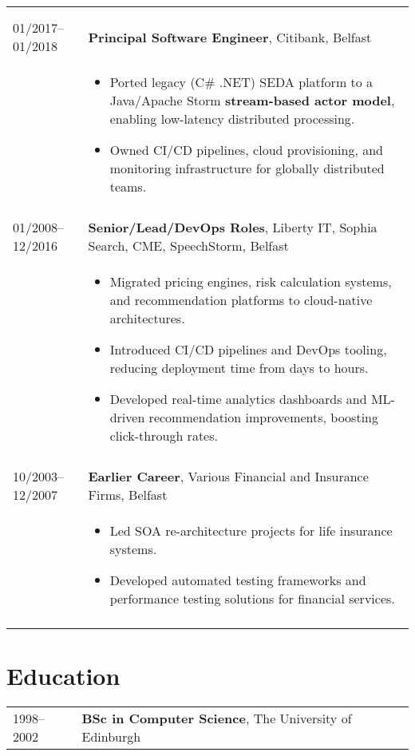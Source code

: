 \documentclass[2pt,a4paper]{article}
\newlength{\datecolumn}
\newlength{\textcolumn}
\begin{document}
\begin{longtable}{p{\datecolumn} p{\textcolumn}}
\begin{itemize}
                   \end{itemize} \\ \\
01/2017--01/2018 & \textbf{Principal Software Engineer}, Citibank, Belfast \\
                 & \begin{itemize}
                        \item Ported legacy (C\# .NET) SEDA platform to a Java/Apache Storm \textbf{stream-based actor model}, enabling low-latency distributed processing.
                        \item Owned CI/CD pipelines, cloud provisioning, and monitoring infrastructure for globally distributed teams.
                   \end{itemize} \\ \\
01/2008--12/2016 & \textbf{Senior/Lead/DevOps Roles}, Liberty IT, Sophia Search, CME, SpeechStorm, Belfast \\
                 & \begin{itemize}
                        \item Migrated pricing engines, risk calculation systems, and recommendation platforms to cloud-native architectures.
                        \item Introduced CI/CD pipelines and DevOps tooling, reducing deployment time from days to hours.
                        \item Developed real-time analytics dashboards and ML-driven recommendation improvements, boosting click-through rates.
                   \end{itemize} \\ \\
10/2003--12/2007 & \textbf{Earlier Career}, Various Financial and Insurance Firms, Belfast \\
                 & \begin{itemize}
                        \item Led SOA re-architecture projects for life insurance systems.
                        \item Developed automated testing frameworks and performance testing solutions for financial services.
                   \end{itemize} \\ \\
\end{longtable}

\section*{Education}
\begin{tabular}{p{\datecolumn} p{\textcolumn}}
1998--2002 & \textbf{BSc in Computer Science}, The University of Edinburgh \\
\end{tabular}
\end{document}
